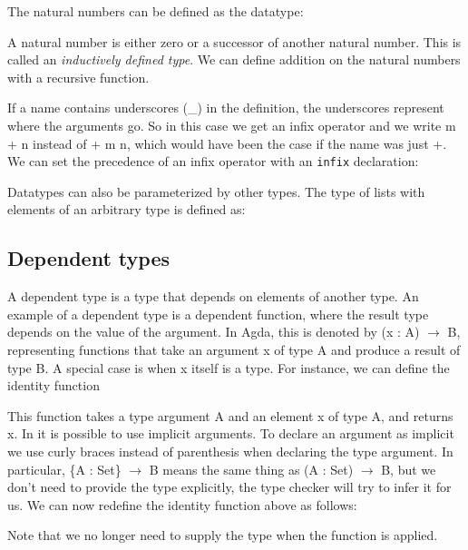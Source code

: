 \documentclass[titlepage]{article}
\begin{document}
The natural numbers can be defined as the datatype:


A natural number is either zero or a successor of another natural number. This is called an \textit{inductively defined type}. We can define addition on the natural numbers with a recursive function.


If a name contains underscores (\_) in the definition, the underscores represent where the arguments go. So in this case we get an infix operator and we write m + n instead of + m n, which would have been the case if the name was just +. We can set the precedence of an infix operator with an \texttt{infix} declaration:


Datatypes can also be parameterized by other types. The type of lists with elements of an arbitrary type is defined as:



\subsection{Dependent types}

A dependent type is a type that depends on elements of another type. An example of a dependent type is a dependent function, where the result type depends on the value of the argument.  In Agda, this is denoted by (x : A) $\to$ B, representing functions that take an argument x of type A and produce a result of type B. A special case is when x itself is a type. For instance, we can define the identity function


This function takes a type argument A and an element x of type A, and returns x. In \Agda it is possible to use implicit arguments. To declare an argument as implicit we use curly braces instead of parenthesis when declaring the type argument. In particular, \{A : Set\} $\to$ B means the same thing as (A : Set) $\to$ B, but we don't need to provide the type explicitly, the type checker will try to infer it for us. We can now redefine the identity function above as follows:


Note that we no longer need to supply the type when the function is applied.
\end{document}
